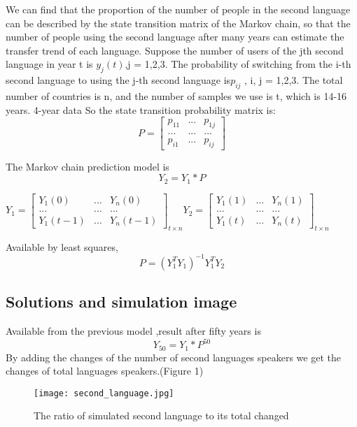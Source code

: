 \documentclass[12pt]{article}  %
\begin{document}
We can find that the proportion of the number of people in the second language can be described by the state transition matrix of the Markov chain, so that the number of people using the second language after many years can estimate the transfer trend of each language. Suppose the number of users of the jth second language in year t is ${{y_j}\left( t \right)}$,j = 1,2,3. The probability of switching from the i-th second language to using the j-th second language is${{p_{ij}}}$ , i, j = 1,2,3. The total number of countries is n, and the number of samples we use is t, which is 14-16 years. 4-year data
So the state transition probability matrix is:
\[P = \left[ {\begin{array}{*{20}{c}}
	{{p_{11}}}&{...}&{{p_{1j}}}\\
	{...}&{...}&{...}\\
	{{p_{i1}}}&{...}&{{p_{ij}}}
	\end{array}} \right]\]

The Markov chain prediction model is \[{Y_2} = {Y_1}*P\]

${{Y_1} = {\left[ {\begin{array}{*{20}{c}}
			{{Y_1}(0)}&{...}&{{Y_n}(0)}\\
			{...}&{...}&{...}\\
			{{Y_1}(t - 1)}&{...}&{{Y_n}(t - 1)}
			\end{array}} \right]_{t \times n}}
	{Y_2} = {\left[ {\begin{array}{*{20}{c}}
			{{Y_1}(1)}&{...}&{{Y_n}(1)}\\
			{...}&{...}&{...}\\
			{{Y_1}(t)}&{...}&{{Y_n}(t)}
			\end{array}} \right]_{t \times n}}}$

Available by least squares,
\[P = {(Y_1^T{Y_1})^{ - 1}}Y_1^T{Y_2}\] 
\subsection{Solutions and simulation image}
Available from the previous model ,result after fifty years is
\[{Y_{50}} = {Y_1}*{P^{50}}\]
By adding the changes of the number of second languages speakers we get the
changes of total languages speakers.(Figure 1)




\begin{figure}[H]
	\centering
	\texttt{[image: second\_language.jpg]}
	\caption{The ratio of simulated second language to its total changed}\label{fig:cnt}
\end{figure}
\end{document}
